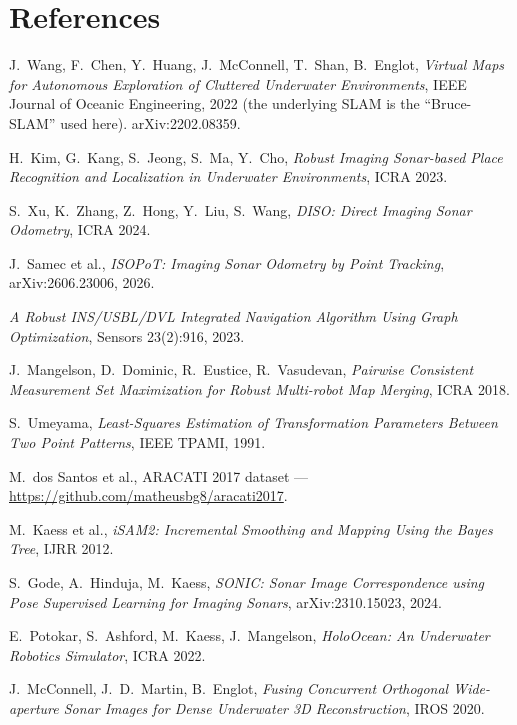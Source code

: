 \section*{References}

\begin{enumerate}[label={[\arabic*]}, leftmargin=1.2cm]
\item \label{bib:bruceslam} J.~Wang, F.~Chen, Y.~Huang, J.~McConnell, T.~Shan, B.~Englot,
  \emph{Virtual Maps for Autonomous Exploration of Cluttered Underwater Environments},
  IEEE Journal of Oceanic Engineering, 2022 (the underlying SLAM is the
  ``Bruce-SLAM'' used here). arXiv:2202.08359.
\item \label{bib:sonarcontext} H.~Kim, G.~Kang, S.~Jeong, S.~Ma, Y.~Cho,
  \emph{Robust Imaging Sonar-based Place Recognition and Localization in Underwater
  Environments}, ICRA 2023.
\item \label{bib:diso} S.~Xu, K.~Zhang, Z.~Hong, Y.~Liu, S.~Wang,
  \emph{DISO: Direct Imaging Sonar Odometry}, ICRA 2024.
\item \label{bib:isopot} J.~Samec et al.,
  \emph{ISOPoT: Imaging Sonar Odometry by Point Tracking}, arXiv:2606.23006, 2026.
\item \label{bib:insusbldvl} \emph{A Robust INS/USBL/DVL Integrated Navigation Algorithm Using Graph
  Optimization}, Sensors 23(2):916, 2023.
\item \label{bib:pcm} J.~Mangelson, D.~Dominic, R.~Eustice, R.~Vasudevan,
  \emph{Pairwise Consistent Measurement Set Maximization for Robust Multi-robot Map
  Merging}, ICRA 2018.
\item \label{bib:umeyama} S.~Umeyama,
  \emph{Least-Squares Estimation of Transformation Parameters Between Two Point
  Patterns}, IEEE TPAMI, 1991.
\item \label{bib:aracati} M.~dos Santos et al., ARACATI 2017 dataset —
  \url{https://github.com/matheusbg8/aracati2017}.
\item \label{bib:isam2} M.~Kaess et al.,
  \emph{iSAM2: Incremental Smoothing and Mapping Using the Bayes Tree}, IJRR 2012.
\item \label{bib:sonic} S.~Gode, A.~Hinduja, M.~Kaess,
  \emph{SONIC: Sonar Image Correspondence using Pose Supervised Learning for Imaging
  Sonars}, arXiv:2310.15023, 2024.
\item \label{bib:holoocean} E.~Potokar, S.~Ashford, M.~Kaess, J.~Mangelson,
  \emph{HoloOcean: An Underwater Robotics Simulator}, ICRA 2022.
\item \label{bib:mcconnell} J.~McConnell, J.~D.~Martin, B.~Englot,
  \emph{Fusing Concurrent Orthogonal Wide-aperture Sonar Images for Dense Underwater
  3D Reconstruction}, IROS 2020.
\end{enumerate}
